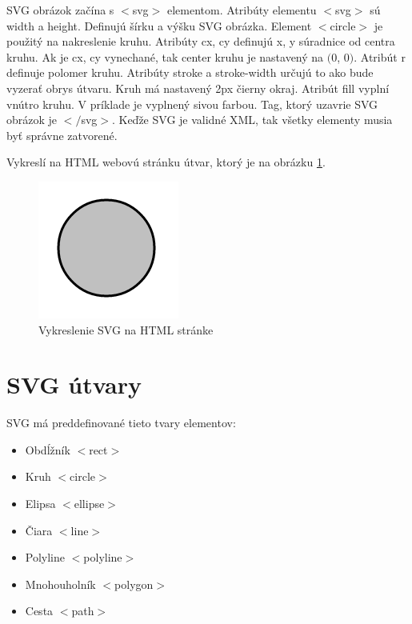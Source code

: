 SVG obrázok začína s $<$svg$>$ elementom. Atribúty elementu $<$svg$>$ sú width a height. Definujú šírku a výšku SVG obrázka. Element $<$circle$>$ je použitý na nakreslenie kruhu. Atribúty cx, cy definujú x, y súradnice od centra kruhu. Ak je cx, cy vynechané, tak center kruhu je nastavený na $($0, 0$)$. Atribút r  definuje polomer kruhu. Atribúty stroke a stroke-width určujú to ako bude vyzerať obrys útvaru. Kruh má nastavený 2px čierny okraj. 
Atribút fill vyplní vnútro kruhu. V príklade je vyplnený sivou farbou. Tag, ktorý uzavrie SVG obrázok je $<$$/$svg$>$. Keďže SVG je validné XML, tak všetky elementy musia byť správne zatvorené. 


Vykreslí na HTML webovú stránku útvar, ktorý je na obrázku \ref{jednoduchyKruh}.

\begin{figure}[ht]
	\begin{center}
		\includegraphics  {obrazky/jednoduchyKruh.png}
		\caption{Vykreslenie SVG na HTML stránke}
		\label{jednoduchyKruh}
	\end{center}
\end{figure}


\section{SVG útvary} 

\acs*{SVG} má preddefinované tieto tvary elementov:
\begin{itemize}
	\item Obdĺžník $<$rect$>$
	\item Kruh $<$circle$>$
	\item Elipsa $<$ellipse$>$
	\item Čiara $<$line$>$
	\item Polyline $<$polyline$>$
	\item Mnohouholník $<$polygon$>$
	\item Cesta $<$path$>$	
\end{itemize}

